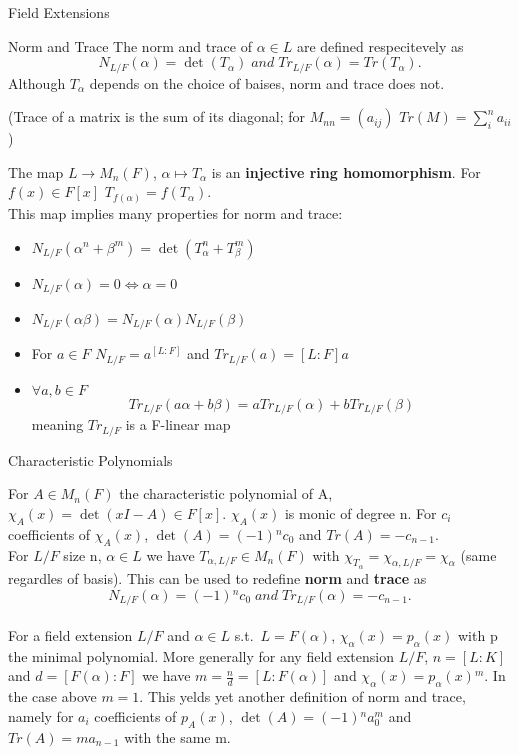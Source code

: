 \documentclass[12pt, letterpaper]{article}
\begin{document}
\begin{section}{Field Extensions}
\begin{subsection}{Norm and Trace}
    The norm and trace of \(\alpha \in L\) are defined respecitevely as
    \[N_{L / F}(\alpha) = \det(T_{\alpha}) \; and \; Tr_{L / F}(\alpha) =
      Tr(T_{\alpha}).\]
    Although \(T_{\alpha}\) depends on the choice of baises, norm and trace
    does not.

    (Trace of a matrix is the sum of its diagonal; for \(M_{nn} = (a_{ij})\)
    \(Tr(M) = \sum^{n}_{i} a_{ii}\))

    The map \(L \to M_{n}(F)\), \(\alpha \mapsto T_{\alpha}\) is an
    \textbf{injective ring homomorphism}. For \(f(x) \in F[x]\)
    \(T_{f(\alpha)} = f(T_{\alpha})\). \\
    This map implies many properties for norm and trace:
    \begin{itemize}
      \item \(N_{L / F}(\alpha^{n} + \beta^{m}) = \det(T_{\alpha}^{n} +
            T_{\beta}^{m})\)
      \item \(N_{L / F}(\alpha) = 0 \iff \alpha = 0\)
      \item \(N_{L / F}(\alpha \beta) = N_{L / F}(\alpha) N_{L / F}(\beta)\)
      \item For \(a \in F\) \(N_{L / F} = a^{[L : F]}\) and
            \(Tr_{L / F}(a) = [L : F] a\)
      \item \(\forall a, b \in F\)
            \[Tr_{L / F}(a \alpha + b \beta) = a Tr_{L / F}(\alpha) +
            b Tr_{L / F}(\beta)\] meaning \(Tr_{L / F}\) is a F-linear map
    \end{itemize}


  \end{subsection}

  \begin{subsection}{Characteristic Polynomials}

    For \(A \in M_{n}(F)\) the characteristic polynomial of A, \(\chi_{A}(x) =
    \det(xI - A) \in F[x]\). \(\chi_{A}(x)\) is monic of degree n. For \(c_{i}\)
    coefficients of \(\chi_{A}(x)\), \(\det(A) = (-1){}^{n} c_{0}\) and
    \(Tr(A) = -c_{n - 1}\). \\
    For \(L / F\) size n, \(\alpha \in L\) we have \(T_{\alpha, L / F} \in
    M_{n}(F)\) with \(\chi_{T_{\alpha}} = \chi_{\alpha, L / F} =
    \chi_{\alpha}\) (same regardles of basis). This can be used to redefine
    \textbf{norm} and \textbf{trace} as \[N_{L / F}(\alpha) = (-1){}^{n} c_{0}
      \; and \; Tr_{L / F}(\alpha) = -c_{n - 1}.\] \\
    For a field extension \(L / F\) and \(\alpha \in L\) s.t.\
    \(L = F(\alpha)\), \(\chi_{\alpha}(x) = p_{\alpha}(x)\) with p the minimal
    polynomial. More generally for any field extension \(L / F\), \(n =
    [L : K]\)and \(d = [F(\alpha) : F]\) we have \(m = \frac{n}{d} =
    [L : F(\alpha)]\) and \(\chi_{\alpha}(x) = p_{\alpha}(x){}^{m}\). In the
    case above \(m = 1\). This yelds yet another definition of norm and trace,
    namely for \(a_{i}\) coefficients of \(p_{A}(x)\), \(\det(A) = (-1){}^{n}
    a_{0}^{m}\) and \(Tr(A) = ma_{n - 1}\) with the same m.

  \end{subsection}

\end{section}
\end{document}
